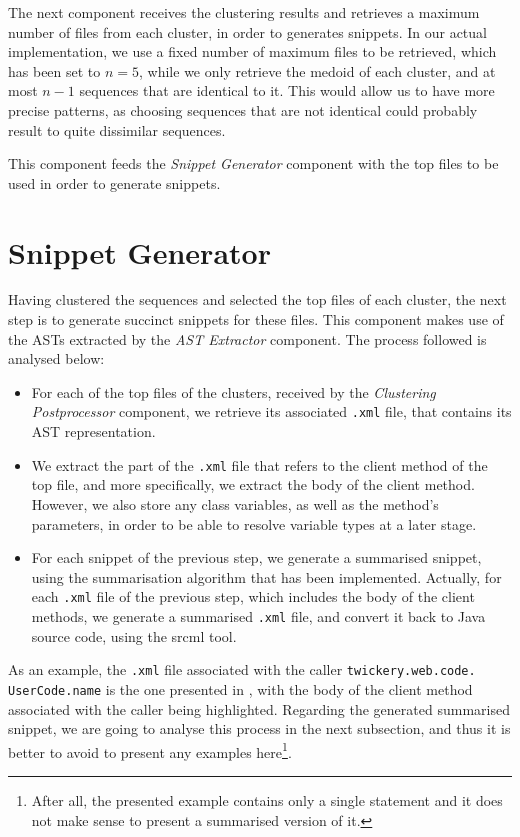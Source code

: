 The next component receives the clustering results and retrieves a maximum number of files from each cluster, in order to generates snippets. In our actual implementation, we use a fixed number of maximum files to be retrieved, which has been set to $n=5$, while we only retrieve the medoid of each cluster, and at most $n-1$ sequences that are identical to it. This would allow us to have more precise patterns, as choosing sequences that are not identical could probably result to quite dissimilar sequences.

This component feeds the \textit{Snippet Generator} component with the top files to be used in order to generate snippets.


\section{Snippet Generator}
\label{sec:snippet-generator}

Having clustered the sequences and selected the top files of each cluster, the next step is to generate succinct snippets for these files. This component makes use of the ASTs extracted by the \textit{AST Extractor} component. The process followed is analysed below:

\begin{itemize}
\item For each of the top files of the clusters, received by the \textit{Clustering Postprocessor} component, we retrieve its associated \texttt{.xml} file, that contains its AST representation.
\item We extract the part of the \texttt{.xml} file that refers to the client method of the top file, and more specifically, we extract the body of the client method. However, we also store any class variables, as well as the method's parameters, in order to be able to resolve variable types at a later stage.
\item For each snippet of the previous step, we generate a summarised snippet, using the summarisation algorithm that has been implemented. Actually, for each \texttt{.xml} file of the previous step, which includes the body of the client methods, we generate a summarised \texttt{.xml} file, and convert it back to Java source code, using the srcml tool.
\end{itemize}

As an example, the \texttt{.xml} file associated with the caller \texttt{twickery.web.code.\protect\\UserCode.name} is the one presented in , with the body of the client method associated with the caller being highlighted. Regarding the generated summarised snippet, we are going to analyse this process in the next subsection, and thus it is better to avoid to present any examples here\footnote{After all, the presented example contains only a single statement and it does not make sense to present a summarised version of it.}.


